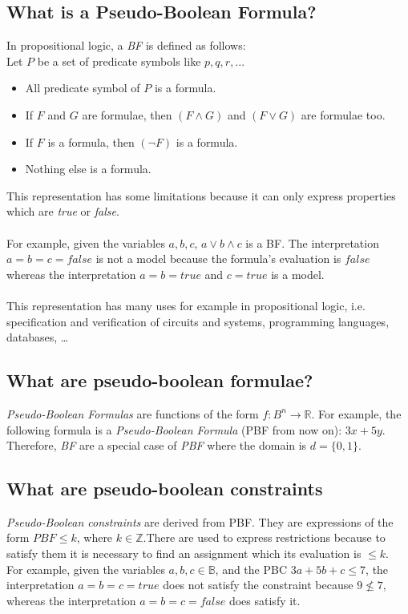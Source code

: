\subsection{What is a Pseudo-Boolean Formula?}
In propositional logic, a \emph{BF} is defined as follows\cite{Lpo}:\\
Let $P$ be a set of predicate symbols like $p,q,r,...$
\begin{itemize}
	\item All predicate symbol of $P$ is a formula.
	\item If $F$ and $G$ are formulae, then $(F \land G)$ and $(F \lor G)$ are formulae too.
	\item If $F$ is a formula, then $(\neg F)$ is a formula.
	\item Nothing else is a formula.
\end{itemize}
This representation has some limitations because it can only express properties which are \emph{true} or \emph{false}.\\\\
For example, given the variables $a,b,c$, $a \vee b \wedge c$ is a BF. The interpretation $a = b =c = false$ is not a model because the formula's evaluation is $false$ whereas the interpretation $a = b = true $ and $c=true$ is a model.\\\\
This representation has many uses for example in propositional logic, i.e. specification and verification of circuits and systems, programming languages, databases, \ldots


\subsection{What are pseudo-boolean formulae?}

\emph{Pseudo-Boolean Formulas} are functions of the form $f:B^n \rightarrow \mathbb{R}$. For example, the following formula is a \emph{Pseudo-Boolean Formula} (PBF from now on): $3x+5y$. Therefore, \emph{BF} are a special case of \emph{PBF} where the domain is $d=\{0,1\}$.\\

\subsection{What are pseudo-boolean constraints}
\emph{Pseudo-Boolean constraints} are derived from PBF. They are expressions of the form $PBF \leq k$, where $k\in \mathbb{Z}$.There are used to express restrictions because to satisfy them it is necessary to find an assignment which its evaluation is $\leq k$.\\
For example, given the variables $a,b,c \in \mathbb{B}$, and the PBC $3a+5b+c \leq 7$, the interpretation $a = b = c = true$ does not satisfy the constraint because $ 9 \nleq 7 $, whereas the interpretation $a =b =c = false$ does satisfy it.



